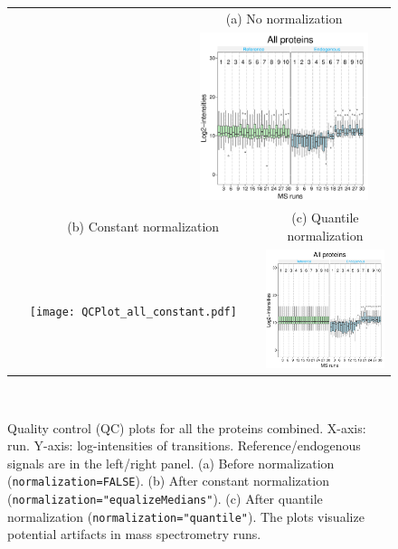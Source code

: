 \documentclass[11pt]{article}
\begin{document}
\begin{enumerate}
\begin{enumerate}
\vspace{-0.3cm}
\begin{figure}[ht!]
\centering
\begin{tabular}{cccc}
$~~~~~~~$&\multicolumn{2}{c}{{\footnotesize (a) No normalization}} & \\
$~~~~~~~~~~~~~~~~~~~~~~~$& \multicolumn{2}{c}{{\includegraphics[width=2.25in]{QCPlot_all_before.pdf}}} &\\
\multicolumn{2}{c}{{\footnotesize $~~~~~~~$(b) Constant normalization}} & \multicolumn{2}{c}{{\footnotesize (c) Quantile normalization}} \\
\multicolumn{2}{c}{\texttt{[image: QCPlot\_all\_constant.pdf]}}&
\multicolumn{2}{c}{\includegraphics[width=2.25in]{QCPlot_all_quantile.pdf}} \\
\end{tabular}\\[-0.15in]
\caption{\small Quality control (QC) plots for all the proteins combined. X-axis: run. Y-axis: log-intensities of transitions. Reference/endogenous signals are in the left/right panel.  (a) Before normalization ({\tt normalization=FALSE}). (b) After constant normalization ({\tt normalization="equalizeMedians"}). (c) After quantile normalization ({\tt normalization="quantile"}). The plots visualize potential artifacts in mass spectrometry runs.}
\label{fig:QC}
\end{figure}


\end{enumerate}
\end{enumerate}
\end{document}
